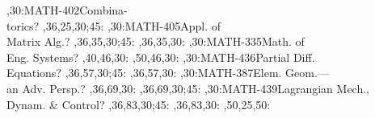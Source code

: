 \documentclass{article}
\begin{document}
\begin{chart}
,30:{MATH-402}{Combina-\\torics}{?}
  ,36,25,30;45:
,30:{MATH-405}{Appl. of\\Matrix Alg.}{?}
  ,36,35,30;45:
  ,36,35,30:
,30:{MATH-335}{Math. of\\Eng. Systems}{?}
  ,40,46,30:
  ,50,46,30:
,30:{MATH-436}{Partial Diff.\\Equations}{?}
  ,36,57,30;45:
  ,36,57,30:
,30:{MATH-387}{Elem. Geom.---\\an Adv. Persp.}{?}
  ,36,69,30:
  ,36,69,30;45:
,30:{MATH-439}{Lagrangian Mech.,\\Dynam. \& Control}{?}
  ,36,83,30;45:
  ,36,83,30:
  ,50,25,50:
\end{chart}
\end{document}
